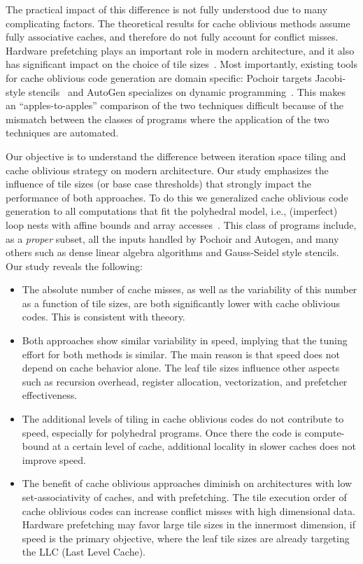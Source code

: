 The practical impact of this difference is not fully understood due to many
complicating factors.  The theoretical results for cache oblivious methods
assume fully associative caches, and therefore do not fully account for
conflict misses.  Hardware prefetching plays an important role in modern
architecture, and it also has significant impact on the choice of tile
sizes~\cite{mehta2016turbotiling}.  Most importantly, existing tools for cache
oblivious code generation are domain specific: Pochoir targets Jacobi-style
stencils~\cite{Tang2011} and AutoGen specializes on dynamic
programming~\cite{autogen-ppopp16}.  This makes an ``apples-to-apples''
comparison of the two techniques difficult because of the mismatch between the
classes of programs where the application of the two techniques are automated.

Our objective is to understand the difference between iteration space tiling
and cache oblivious strategy on modern architecture.  Our study emphasizes the
influence of tile sizes (or base case thresholds) that strongly impact the
performance of both approaches.  To do this we generalized cache oblivious
code generation to all computations that fit the polyhedral model, i.e.,
(imperfect) loop nests with affine bounds and array
accesses~\cite{feautrier2011polyhedral, sanjay-fsttcs86, quinton-jvsp89,
  quinton-sanjay-tf, feautrier91, feautrier92a, feautrier92b}.  This class of
programs include, as a \emph{proper} subset, all the inputs handled by Pochoir
and Autogen, and many others such as dense linear algebra algorithms and
Gauss-Seidel style stencils.  Our study reveals the following:
\begin{itemize}\itemsep 0mm
\item The absolute number of cache misses, as well as the variability of this
  number as a function of tile sizes, are both significantly lower with cache
  oblivious codes.  This is consistent with theeory.
\item Both approaches show similar variability in speed,
  implying that the tuning effort for both methods is similar.  The main
  reason is that speed does not depend on cache behavior alone.  The leaf tile
  sizes influence other aspects such as recursion overhead, register
  allocation, vectorization, and prefetcher effectiveness.
\item The additional levels of tiling in cache oblivious codes do not
  contribute to speed, especially for polyhedral programs.  Once there the
  code is compute-bound at a certain level of cache, additional locality in
  slower caches does not improve speed.
\item The benefit of cache oblivious approaches diminish on architectures with
  low set-associativity of caches, and with prefetching.  The tile execution
  order of cache oblivious codes can increase conflict misses with high
  dimensional data.  Hardware prefetching may favor large tile sizes in the
  innermost dimension, if speed is the primary objective, where the leaf tile
  sizes are already targeting the LLC (Last Level Cache).
\end{itemize}
